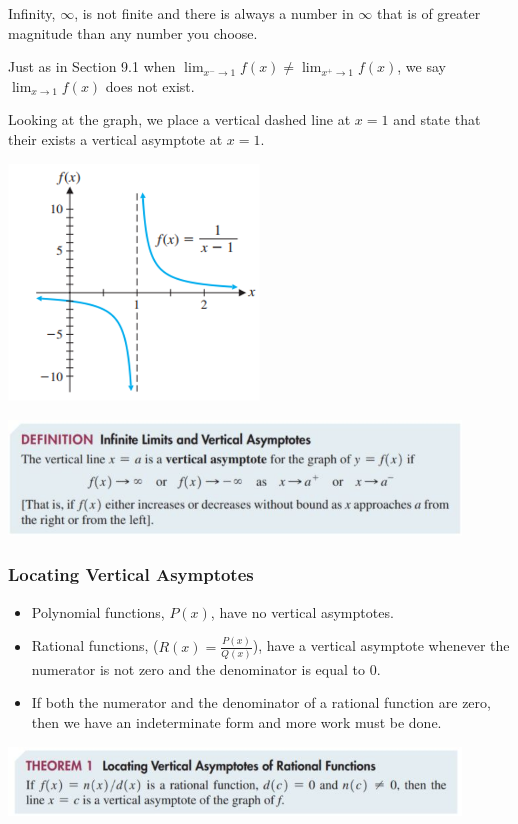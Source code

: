 \documentclass[14pt]{extarticle}
\begin{document}
Infinity, $\infty$, is not finite and there is always a number in $\infty$ that is of greater magnitude than any number you choose.

Just as in Section 9.1 when $\lim_{x^-\to 1}f(x) \neq \lim_{x^+\to 1}f(x)$, we say $\lim_{x\to 1}f(x)$ does not exist.

Looking at the graph, we place a vertical dashed line at $x=1$ and state that their exists a vertical asymptote at $x=1$.
\begin{center}
	\includegraphics[width=0.5\textwidth]{9-2-20}
\end{center}
\begin{center}
	\includegraphics[width=0.9\textwidth]{9-2-20b}
\end{center}

\subsubsection{Locating Vertical Asymptotes}
\begin{itemize}
	\item Polynomial functions, $P(x)$, have no vertical asymptotes.
	\item Rational functions, ($R(x)=\frac{P(x)}{Q(x)}$), have a vertical asymptote whenever the numerator is not zero and the denominator is equal to 0.
	\item If both the numerator and the denominator of a rational function are zero, then we have an indeterminate form and more work must be done.
\end{itemize}
\begin{center}
	\includegraphics[width=0.9\textwidth]{9-2-20c}
\end{center}
\end{document}
